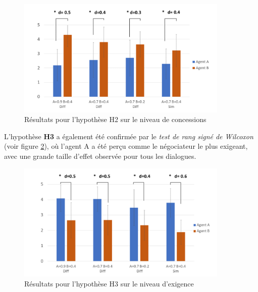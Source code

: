 {			\begin{figure}[h]
				\includegraphics[width=0.9\textwidth, height= 0.25 \textheight]{Figures/chap4/AA/graphs/Diapositive2.PNG}
				\caption{Résultats pour l'hypothèse H2 sur le niveau de concessions \label{fig:H2}}
			\end{figure}
			
			\par L'hypothèse \textbf {H3} a également été confirmée par le \emph {test de rang signé de Wilcoxon} (voir figure \ref{fig:H3}), où l'agent A a été perçu comme le négociateur le plus exigeant, avec une grande taille d'effet observée pour tous les dialogues. 
			\begin{figure}[h]
				\includegraphics[width=0.9\textwidth, height= 0.25 \textheight]{Figures/chap4/AA/graphs/Diapositive3.PNG}
				\caption{Résultats pour l'hypothèse H3 sur le niveau d'exigence\label{fig:H3}}
			\end{figure}
			
}
